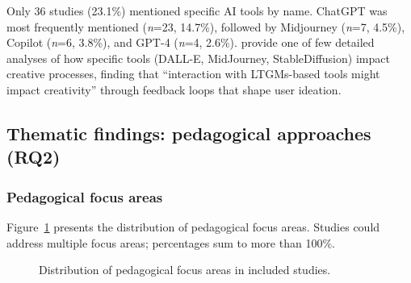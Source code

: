 \documentclass[ed]{acnsart}
\begin{document}
Only 36 studies (23.1\%) mentioned specific AI tools by name. ChatGPT was most frequently mentioned (\textit{n}=23, 14.7\%), followed by Midjourney (\textit{n}=7, 4.5\%), Copilot (\textit{n}=6, 3.8\%), and GPT-4 (\textit{n}=4, 2.6\%). \citet{Turchi2023} provide one of few detailed analyses of how specific tools (DALL-E, MidJourney, StableDiffusion) impact creative processes, finding that ``interaction with LTGMs-based tools might impact creativity'' through feedback loops that shape user ideation.

\subsection{Thematic findings: pedagogical approaches (RQ2)}

\subsubsection{Pedagogical focus areas}

Figure~\ref{fig:pedagogy} presents the distribution of pedagogical focus areas. Studies could address multiple focus areas; percentages sum to more than 100\%.

\begin{figure}[htbp]
\centering
{}
\caption{Distribution of pedagogical focus areas in included studies.}
\label{fig:pedagogy}
\end{figure}
\end{document}

